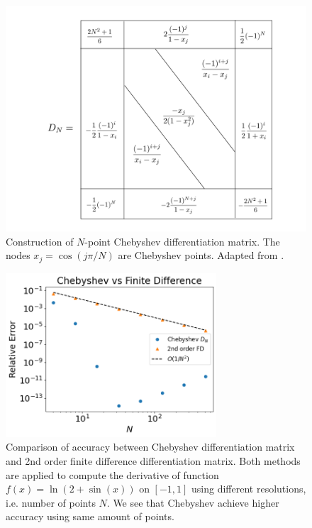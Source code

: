 \begin{figure} [htbp]
	\centering
	\includegraphics[width=\textwidth]{figures/chebyshev-differentiation-matrix.png}
	\caption{Construction of $N$-point Chebyshev differentiation matrix. The nodes $x_j = \cos(j\pi/N)$ are Chebyshev points. Adapted from \cite{trefethen_spectral_2000}.}
	\label{fig:chebyshev-differentiation-matrix}
\end{figure}

\begin{figure}
	\centering
	\includegraphics[width=0.7\textwidth]{figures/chebyshev-vs-fd.png}
	\caption{Comparison of accuracy between Chebyshev differentiation matrix and 2nd order finite difference differentiation matrix. Both methods are applied to compute the derivative of function $f(x)=\ln(2+\sin(x))$ on $[-1,1]$ using different resolutions, i.e. number of points $N$. We see that Chebyshev achieve higher accuracy using same amount of points.}
	\label{fig:chebyshev-vs-fd}
\end{figure}

